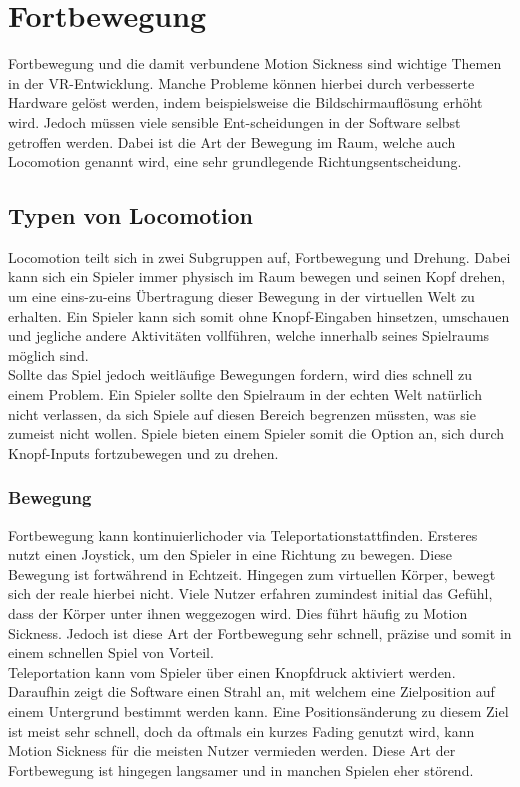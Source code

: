 \section{Fortbewegung}
Fortbewegung und die damit verbundene Motion Sickness sind wichtige Themen in der VR-Entwicklung. Manche Probleme können hierbei durch verbesserte Hardware gelöst werden, indem beispielsweise die Bildschirmauflösung erhöht wird. Jedoch müssen viele sensible Ent-scheidungen in der Software selbst getroffen werden. Dabei ist die Art der Bewegung im Raum, welche auch Locomotion genannt wird, eine sehr grundlegende Richtungsentscheidung.

\subsection{Typen von Locomotion}
Locomotion teilt sich in zwei Subgruppen auf, Fortbewegung und Drehung. Dabei kann sich ein Spieler immer physisch im Raum bewegen und seinen Kopf drehen, um eine eins-zu-eins Übertragung dieser Bewegung in der virtuellen Welt zu erhalten. Ein Spieler kann sich somit ohne Knopf-Eingaben hinsetzen, umschauen und jegliche andere Aktivitäten vollführen, welche innerhalb seines Spielraums möglich sind.\\
Sollte das Spiel jedoch weitläufige Bewegungen fordern, wird dies schnell zu einem Problem. Ein Spieler sollte den Spielraum in der echten Welt natürlich nicht verlassen, da sich Spiele auf diesen Bereich begrenzen müssten, was sie zumeist nicht wollen. Spiele bieten einem Spieler somit die Option an, sich durch Knopf-Inputs fortzubewegen und zu drehen.
\subsubsection{Bewegung}
Fortbewegung kann \dq kontinuierlich\dq oder via \dq Teleportation\dq stattfinden. Ersteres nutzt einen Joystick, um den Spieler in eine Richtung zu bewegen. Diese Bewegung ist fortwährend in Echtzeit. Hingegen zum virtuellen Körper, bewegt sich der reale hierbei nicht. Viele Nutzer erfahren zumindest initial das Gefühl, dass der Körper unter ihnen weggezogen wird. Dies führt häufig zu Motion Sickness. Jedoch ist diese Art der Fortbewegung sehr schnell, präzise und somit in einem schnellen Spiel von Vorteil.\\
Teleportation kann vom Spieler über einen Knopfdruck aktiviert werden. Daraufhin zeigt die Software einen Strahl an, mit welchem eine Zielposition auf einem Untergrund bestimmt werden kann. Eine Positionsänderung zu diesem Ziel ist meist sehr schnell, doch da oftmals ein kurzes Fading genutzt wird, kann Motion Sickness für die meisten Nutzer vermieden werden. Diese Art der Fortbewegung ist hingegen langsamer und in manchen Spielen eher störend.

